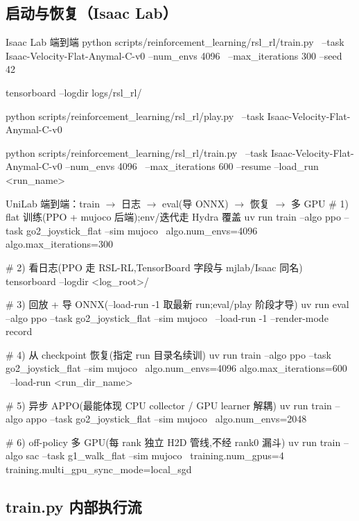 \subsection{启动与恢复（Isaac Lab）}

\begin{codebox}[bash]{Isaac Lab 端到端}
python scripts/reinforcement_learning/rsl_rl/train.py \
  --task Isaac-Velocity-Flat-Anymal-C-v0 --num_envs 4096 \
  --max_iterations 300 --seed 42

tensorboard --logdir logs/rsl_rl/

python scripts/reinforcement_learning/rsl_rl/play.py \
  --task Isaac-Velocity-Flat-Anymal-C-v0

python scripts/reinforcement_learning/rsl_rl/train.py \
  --task Isaac-Velocity-Flat-Anymal-C-v0 --num_envs 4096 \
  --max_iterations 600 --resume --load_run <run_name>
\end{codebox}

\begin{codebox}[bash]{UniLab 端到端：train $\to$ 日志 $\to$ eval(导 ONNX) $\to$ 恢复 $\to$ 多 GPU}
# 1) flat 训练(PPO + mujoco 后端);env/迭代走 Hydra 覆盖
uv run train --algo ppo --task go2_joystick_flat --sim mujoco \
    algo.num_envs=4096 algo.max_iterations=300

# 2) 看日志(PPO 走 RSL-RL,TensorBoard 字段与 mjlab/Isaac 同名)
tensorboard --logdir <log_root>/

# 3) 回放 + 导 ONNX(--load-run -1 取最新 run;eval/play 阶段才导)
uv run eval --algo ppo --task go2_joystick_flat --sim mujoco \
    --load-run -1 --render-mode record

# 4) 从 checkpoint 恢复(指定 run 目录名续训)
uv run train --algo ppo --task go2_joystick_flat --sim mujoco \
    algo.num_envs=4096 algo.max_iterations=600 \
    --load-run <run_dir_name>

# 5) 异步 APPO(最能体现 CPU collector / GPU learner 解耦)
uv run train --algo appo --task go2_joystick_flat --sim mujoco \
    algo.num_envs=2048

# 6) off-policy 多 GPU(每 rank 独立 H2D 管线,不经 rank0 漏斗)
uv run train --algo sac --task g1_walk_flat --sim mujoco \
    training.num_gpus=4 training.multi_gpu_sync_mode=local_sgd
\end{codebox}

\subsection{train.py 内部执行流}

